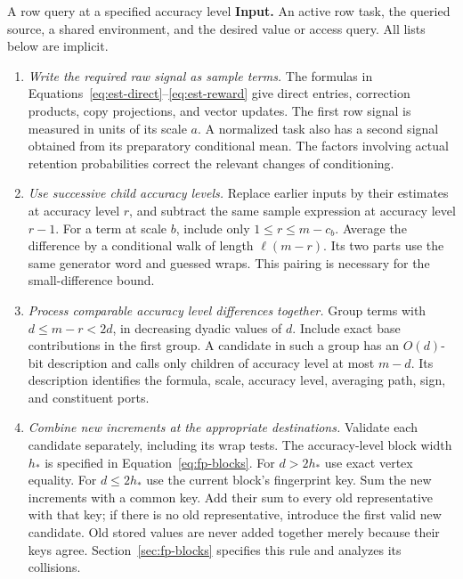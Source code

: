 \documentclass[11pt]{article}
\numberwithin{equation}{section}
\theoremstyle{definition}
\theoremstyle{remark}
\begin{document}
\begin{algorithm}[label=alg:entry-query]{A row query at a specified accuracy level}
\textbf{Input.} An active row task, the queried source, a shared environment, and the desired value or access query. All lists below are implicit.
\begin{enumerate}[leftmargin=*]
\item \emph{Write the required raw signal as sample terms.} The formulas in Equations~\eqref{eq:est-direct}--\eqref{eq:est-reward} give direct entries, correction products, copy projections, and vector updates. The first row signal is measured in units of its scale $a$. A normalized task also has a second signal obtained from its preparatory conditional mean. The factors involving actual retention probabilities correct the relevant changes of conditioning.

\item \emph{Use successive child accuracy levels.} Replace earlier inputs by their estimates at accuracy level ${r}$, and subtract the same sample expression at accuracy level ${r}-1$. For a term at scale $b$, include only $1\le {r}\le {m}-c_b$. Average the difference by a conditional walk of length $\ell({m}-{r})$. Its two parts use the same generator word and guessed wraps. This pairing is necessary for the small-difference bound.

\item \emph{Process comparable accuracy level differences together.} Group terms with $d\le {m}-{r}<2d$, in decreasing dyadic values of $d$. Include exact base contributions in the first group. A candidate in such a group has an $O(d)$-bit description and calls only children of accuracy level at most ${m}-d$. Its description identifies the formula, scale, accuracy level, averaging path, sign, and constituent ports.

\item \emph{Combine new increments at the appropriate destinations.} Validate each candidate separately, including its wrap tests. The accuracy-level block width $h_*$ is specified in Equation~\eqref{eq:fp-blocks}. For $d>2h_*$ use exact vertex equality. For $d\le2h_*$ use the current block's fingerprint key. Sum the new increments with a common key. Add their sum to every old representative with that key; if there is no old representative, introduce the first valid new candidate. Old stored values are never added together merely because their keys agree. Section~\ref{sec:fp-blocks} specifies this rule and analyzes its collisions.


\end{enumerate}
\end{algorithm}
\end{document}
